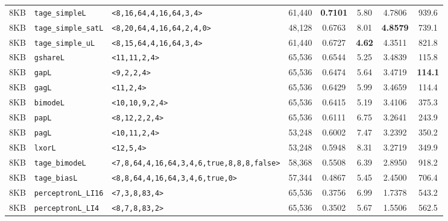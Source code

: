 \documentclass[11pt,a4paper,twocolumn]{article}
\begin{document}
\begin{table}[htbp]
{\begin{tabular}{|l l l H c c c c|}
    8KB & \texttt{tage\_simpleL} & \texttt{<8,16,64,4,16,64,3,4>} & 61,440 & \textbf{0.7101} & 5.80 & 4.7806 & 939.6 \\
    8KB & \texttt{tage\_simple\_satL} & \texttt{<8,20,64,4,16,64,2,4,0>} & 48,128 & 0.6763 & 8.01 & \textbf{4.8579} & 739.1 \\
    8KB & \texttt{tage\_simple\_uL} & \texttt{<8,15,64,4,16,64,3,4>} & 61,440 & 0.6727 & \textbf{4.62} & 4.3511 & 821.8 \\
    8KB & \texttt{gshareL} & \texttt{<11,11,2,4>} & 65,536 & 0.6544 & 5.25 & 3.4839 & 115.8 \\
    8KB & \texttt{gapL} & \texttt{<9,2,2,4>} & 65,536 & 0.6474 & 5.64 & 3.4719 & \textbf{114.1} \\
    8KB & \texttt{gagL} & \texttt{<11,2,4>} & 65,536 & 0.6429 & 5.99 & 3.4659 & 114.4 \\
    8KB & \texttt{bimodeL} & \texttt{<10,10,9,2,4>} & 65,536 & 0.6415 & 5.19 & 3.4106 & 375.3 \\
    8KB & \texttt{papL} & \texttt{<8,12,2,2,4>} & 65,536 & 0.6111 & 6.75 & 3.2641 & 243.9 \\
    8KB & \texttt{pagL} & \texttt{<10,11,2,4>} & 53,248 & 0.6002 & 7.47 & 3.2392 & 350.2 \\
    8KB & \texttt{lxorL} & \texttt{<12,5,4>} & 53,248 & 0.5948 & 8.31 & 3.2719 & 349.9 \\
    8KB & \texttt{tage\_bimodeL} & \texttt{<7,8,64,4,16,64,3,4,6,true,8,8,8,false>} & 58,368 & 0.5508 & 6.39 & 2.8950 & 918.2 \\
    8KB & \texttt{tage\_biasL} & \texttt{<8,8,64,4,16,64,3,4,6,true,0>} & 57,344 & 0.4867 & 5.45 & 2.4500 & 706.4 \\
    8KB & \texttt{perceptronL\_LI16} & \texttt{<7,3,8,83,4>} & 65,536 & 0.3756 & 6.99 & 1.7378 & 543.2 \\
    8KB & \texttt{perceptronL\_LI4} & \texttt{<8,7,8,83,2>} & 65,536 & 0.3502 & 5.67 & 1.5506 & 562.5 \\
    \hline
    \end{tabular}%
    }
    \label{table:block_avg_performance}
\end{table}
\end{document}
